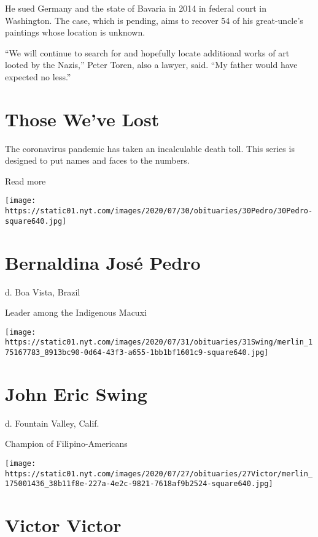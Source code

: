 He sued Germany and the state of Bavaria in 2014 in federal court in
Washington. The case, which is pending, aims to recover 54 of his
great-uncle's paintings whose location is unknown.

``We will continue to search for and hopefully locate additional works
of art looted by the Nazis,'' Peter Toren, also a lawyer, said. ``My
father would have expected no less.''

\href{https://www.nytimes.com/interactive/2020/obituaries/people-died-coronavirus-obituaries.html?action=click\&pgtype=Article\&state=default\&region=BELOW_MAIN_CONTENT\&context=covid_obits_promo}{}

\hypertarget{those-weve-lost}{%
\section{Those We've Lost}\label{those-weve-lost}}

The coronavirus pandemic has taken an incalculable death toll. This
series is designed to put names and faces to the numbers.

Read more

\texttt{[image: https://static01.nyt.com/images/2020/07/30/obituaries/30Pedro/30Pedro-square640.jpg]}

\hypertarget{bernaldina-josuxe9-pedro}{%
\section{Bernaldina José Pedro}\label{bernaldina-josuxe9-pedro}}

d. Boa Vista, Brazil

Leader among the Indigenous Macuxi

\texttt{[image: https://static01.nyt.com/images/2020/07/31/obituaries/31Swing/merlin\_175167783\_8913bc90-0d64-43f3-a655-1bb1bf1601c9-square640.jpg]}

\hypertarget{john-eric-swing}{%
\section{John Eric Swing}\label{john-eric-swing}}

d. Fountain Valley, Calif.

Champion of Filipino-Americans

\texttt{[image: https://static01.nyt.com/images/2020/07/27/obituaries/27Victor/merlin\_175001436\_38b11f8e-227a-4e2c-9821-7618af9b2524-square640.jpg]}

\hypertarget{victor-victor}{%
\section{Victor Victor}\label{victor-victor}}

